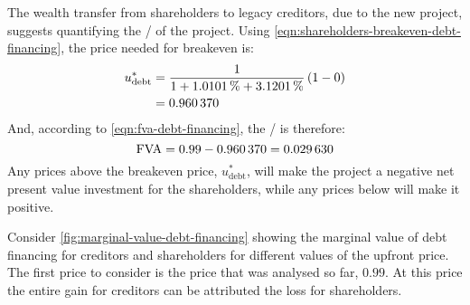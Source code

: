 \documentclass[main.tex]{subfiles}
\begin{document}
        The wealth transfer from shareholders to legacy creditors, due to the new project,
        suggests quantifying the \FVA/ of the project.
        Using \cref{eqn:shareholders-breakeven-debt-financing}, the price needed for breakeven is:
            \begin{align*}
                    u^{\ast}_{\text{debt}} 
                &=
                    \frac{
                        \num{1}
                    }{
                        \num{1} + \pct{0.010101} + \pct{0.031201}
                    }
                    \left(
                        \num{1}
                        -
                        \num{0}
                    \right)
                \nonumber \\
                &=
                    \num{0.960370}
            \end{align*}
        And, according to \cref{eqn:fva-debt-financing}, the \FVA/ is therefore:
            \begin{equation*}
                    \FVA/ 
                =
                    \num{0.99} - \num{0.960370}
                =
                    \num{0.029630}
            \end{equation*}
        Any prices above the breakeven price, $u^{\ast}_{\text{debt}}$, 
        will make the project a negative net present value investment for the shareholders, while any prices below will make it positive. 
        
        Consider \cref{fig:marginal-value-debt-financing} showing the marginal value 
        of debt financing for creditors and shareholders for different values of the upfront price.
        The first price to consider is the price that was analysed so far, $\num{0.99}$.
        At this price the entire gain for creditors can be attributed the loss for shareholders.
\end{document}
